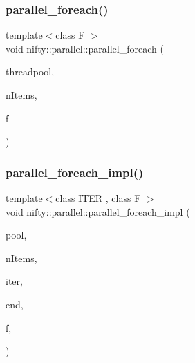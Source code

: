 \subsubsection{\texorpdfstring{parallel\+\_\+foreach()}{parallel\_foreach()}\hspace{0.1cm}{\footnotesize\ttfamily [4/4]}}
{\footnotesize\ttfamily template$<$class F $>$ \\
void nifty\+::parallel\+::parallel\+\_\+foreach (\begin{DoxyParamCaption}\item[{\hyperlink{classnifty_1_1parallel_1_1ThreadPool}{Thread\+Pool} \&}]{threadpool,  }\item[{std\+::ptrdiff\+\_\+t}]{n\+Items,  }\item[{F \&\&}]{f }\end{DoxyParamCaption})\hspace{0.3cm}{\ttfamily [inline]}}

\mbox{\label{group__ParallelProcessing_ga7604490d8cf7a5b53de4477c866c8b86}} 
\subsubsection{\texorpdfstring{parallel\+\_\+foreach\+\_\+impl()}{parallel\_foreach\_impl()}\hspace{0.1cm}{\footnotesize\ttfamily [1/3]}}
{\footnotesize\ttfamily template$<$class I\+T\+ER , class F $>$ \\
void nifty\+::parallel\+::parallel\+\_\+foreach\+\_\+impl (\begin{DoxyParamCaption}\item[{\hyperlink{classnifty_1_1parallel_1_1ThreadPool}{Thread\+Pool} \&}]{pool,  }\item[{const std\+::ptrdiff\+\_\+t}]{n\+Items,  }\item[{I\+T\+ER}]{iter,  }\item[{I\+T\+ER}]{end,  }\item[{F \&\&}]{f,  }\item[{std\+::random\+\_\+access\+\_\+iterator\+\_\+tag}]{ }\end{DoxyParamCaption})\hspace{0.3cm}{\ttfamily [inline]}}

